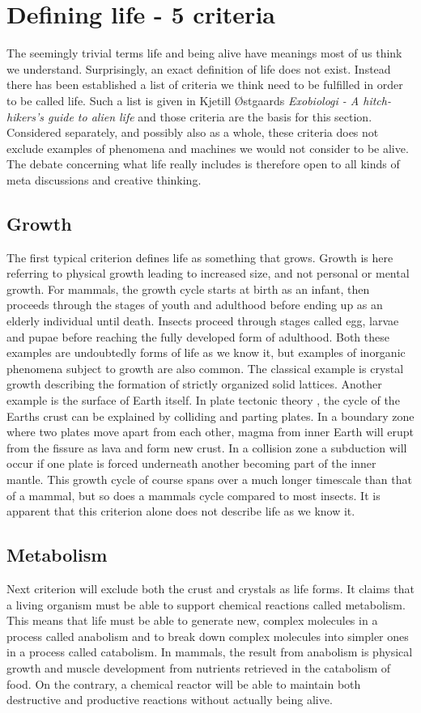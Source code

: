 \section{Defining life - 5 criteria}
The seemingly trivial terms life and being alive have meanings most of us think we understand.
Surprisingly, an exact definition of life does not exist.
Instead there has been established a list of criteria we think need to be fulfilled in order to be called life.
Such a list is given in Kjetill Østgaards \textit{Exobiologi - A hitch-hikers's guide to alien life} \cite{Exoboken} and those criteria are the basis for this section.
Considered separately, and possibly also as a whole, these criteria does not exclude examples of phenomena and machines we would not consider to be alive.
The debate concerning what life really includes is therefore open to all kinds of meta discussions and creative thinking.

\subsection{Growth}
The first typical criterion defines life as something that grows.
Growth is here referring to physical growth leading to increased size, and not personal or mental growth.
For mammals, the growth cycle starts at birth as an infant, then proceeds through the stages of youth and adulthood before ending up as an elderly individual until death.
Insects proceed through stages called egg, larvae and pupae before reaching the fully developed form of adulthood.
Both these examples are undoubtedly forms of life as we know it, but examples of inorganic phenomena subject to growth are also common.
The classical example is crystal growth describing the formation of strictly organized solid lattices.
Another example is the surface of Earth itself.
In plate tectonic theory \cite{tectonic}, the cycle of the Earths crust can be explained by colliding and parting plates.
In a boundary zone where two plates move apart from each other, magma from inner Earth will erupt from the fissure as lava and form new crust.
In a collision zone a subduction will occur if one plate is forced underneath another becoming part of the inner mantle.
This growth cycle of course spans over a much longer timescale than that of a mammal, but so does a mammals cycle compared to most insects.
It is apparent that this criterion alone does not describe life as we know it.

\subsection{Metabolism}
Next criterion will exclude both the crust and crystals as life forms.
It claims that a living organism must be able to support chemical reactions called metabolism.
This means that life must be able to generate new, complex molecules in a process called anabolism and to break down complex molecules into simpler ones in a process called catabolism.
In mammals, the result from anabolism is physical growth and muscle development from nutrients retrieved in the catabolism of food.
On the contrary, a chemical reactor will be able to maintain both destructive and productive reactions without actually being alive.

